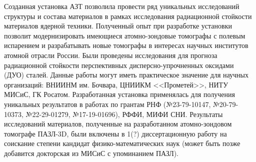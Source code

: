 {\influence} Созданная установка АЗТ позволила провести ряд уникальных исследований структуры и состава материалов в рамках исследования радиационной стойкости материалов ядерной техники. Полученный опыт при разработке установки позволит модернизировать имеющиеся атомно-зондовые томографы с полевым испарением и разрабатывать новые томографы в интересах научных институтов атомной отрасли России. Были проведены исследования для прогноза радиационной стойкости перспективных дисперсно-упрочненных оксидами (ДУО) сталей. Данные работы могут иметь практическое значение для научных организаций: ВНИИНМ им. Бочвара, ЦНИИКМ <<Прометей>>, НИТУ МИСиС, ГК Росатом. Разработанная установка применялась для получения уникальных результатов в работах по грантам РНФ (№23-79-10147, №20-79-10373, №22-29-01279, №17-19-01696), РФФИ, МИФИ СНИ. Результаты исследований материалов, полученные на разработанном атомно-зондовом томографе ПАЗЛ-3D, были включены в 1(?) диссертационную работу на соискание степени кандидат физико-математических наук (может быть позже добавится докторская из МИСиС с упоминанием ПАЗЛ).

